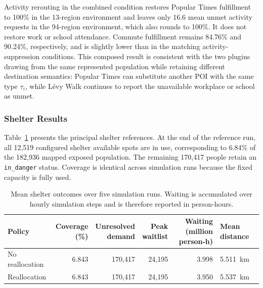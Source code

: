 Activity rerouting in the combined condition restores Popular Times fulfillment to 100\% in the 13-region environment and leaves only 16.6 mean unmet activity requests in the 94-region environment, which also rounds to 100\%. It does not restore work or school attendance. Commute fulfillment remains 84.76\% and 90.24\%, respectively, and is slightly lower than in the matching activity-suppression conditions. This composed result is consistent with the two plugins drawing from the same represented population while retaining different destination semantics: Popular Times can substitute another POI with the same type $\tau_i$, while L\'evy Walk continues to report the unavailable workplace or school as unmet.



\subsubsection{Shelter Results}

Table~\ref{tbl:shelter_reference_results} presents the principal shelter references. At the end of the reference run, all 12,519 configured shelter available spots are in use, corresponding to 6.84\% of the 182,936 mapped exposed population. The remaining 170,417 people retain an \texttt{in\_danger} status. Coverage is identical across simulation runs because the fixed capacity is fully used.

\begin{table}[ht]
\centering
\footnotesize
\caption{Mean shelter outcomes over five simulation runs. Waiting is accumulated over hourly simulation steps and is therefore reported in person-hours.}
\label{tbl:shelter_reference_results}
\begin{tabularx}{\linewidth}{@{}lrrrrX@{}}
\toprule
\textbf{Policy} &
\shortstack{\textbf{Coverage}\\\textbf{(\%)}} &
\shortstack{\textbf{Unresolved}\\\textbf{demand}} &
\shortstack{\textbf{Peak}\\\textbf{waitlist}} &
\shortstack{\textbf{Waiting}\\\textbf{(million person-h)}} &
\textbf{Mean distance} \\
\midrule
No reallocation
    & 6.843 & 170,417 & 24,195 & 3.998 & 5.511~km \\
Reallocation
    & 6.843 & 170,417 & 24,195 & 3.950 & 5.537~km \\
\bottomrule
\end{tabularx}
\end{table}

